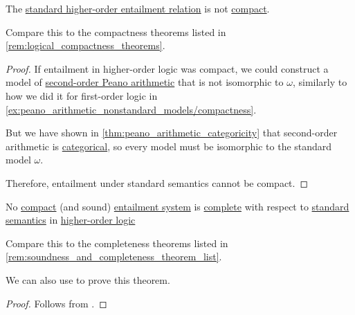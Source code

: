 \begin{theorem}\label{thm:hol_semantic_not_compact}
  The \hyperref[def:hol_semantics/entailment]{standard higher-order entailment relation} is not \hyperref[def:consequence_relation/compactness]{compact}.
\end{theorem}
\begin{comments}
  \item Compare this to the compactness theorems listed in \cref{rem:logical_compactness_theorems}.
\end{comments}
\begin{proof}
  If entailment in higher-order logic was compact, we could construct a model of \hyperref[def:peano_arithmetic]{second-order Peano arithmetic} that is not isomorphic to \( \omega \), similarly to how we did it for first-order logic in \cref{ex:peano_arithmetic_nonstandard_models/compactness}.

  But we have shown in \cref{thm:peano_arithmetic_categoricity} that second-order arithmetic is \hyperref[def:hol_theory/categorical]{categorical}, so every model must be isomorphic to the standard model \( \omega \).

  Therefore, entailment under standard semantics cannot be compact.
\end{proof}

\begin{theorem}\label{thm:hol_incompleteness}
  No \hyperref[def:consequence_relation/compactness]{compact} (and sound) \hyperref[def:entailment_system]{entailment system} is \hyperref[def:general_logic/completeness]{complete} with respect to \hyperref[def:hol_semantics/standard]{standard semantics} in \hyperref[def:higher_order_logic]{higher-order logic}
\end{theorem}
\begin{comments}
  \item Compare this to the completeness theorems listed in \cref{rem:soundness_and_completeness_theorem_list}.

  \item We can also use  to prove this theorem.
\end{comments}
\begin{proof}
  Follows from .
\end{proof}
